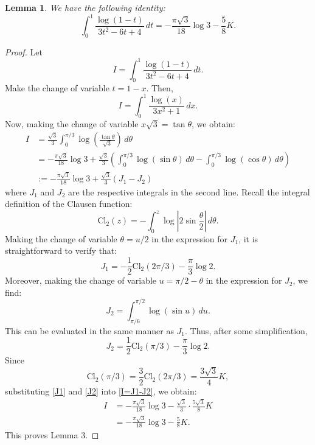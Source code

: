 \documentclass[10pt,a4paper]{amsart}
\numberwithin{equation}{section}
\newtheorem{lemma}{Lemma}
\begin{document}
\begin{lemma}
    We have the following identity:
    \begin{equation}
    \int_0^1\frac{\log(1-t)}{3t^2-6t+4}\,dt=-\frac{\pi\sqrt{3}}{18}\log3-\frac{5}{8}K.
    \label{lem3}
    \end{equation}
\end{lemma}

\begin{proof}
    Let 
    \[I=\int_0^1\frac{\log(1-t)}{3t^2-6t+4}\,dt.\]
    Make the change of variable $t=1-x$. Then,
    \[I=\int_0^1\frac{\log(x)}{3x^2+1}\,dx.\]
    Now, making the change of variable $x\sqrt3=\tan\theta$, we obtain:
    \begin{align}
        I&=\frac{\sqrt3}{3}\int_0^{\pi/3}\log\left(\frac{\tan\theta}{\sqrt3}\right)\,d\theta\nonumber\\
        &=-\frac{\pi\sqrt{3}}{18}\log3+\frac{\sqrt3}{3}\left(\int_0^{\pi/3}\log\left(\sin\theta\right)\,d\theta-\int_0^{\pi/3}\log\left(\cos\theta\right)\,d\theta\right)\nonumber\\
        &:=-\frac{\pi\sqrt{3}}{18}\log3+\frac{\sqrt3}3(J_1-J_2)
        \label{I=J1-J2}
    \end{align}
    where $J_1$ and $J_2$ are the respective integrals in the second line. Recall the integral definition of the Clausen function:
    \[\text{Cl}_2(z)=-\int_0^z\log\left|2\sin\frac{\theta}{2}\right|\,d\theta.\]
    Making the change of variable $\theta=u/2$ in the expression for $J_1$, it is straightforward to verify that:
    \begin{equation}
        J_1=-\frac12\text{Cl}_2(2\pi/3)-\frac\pi3\log2.
    \label{J1}
    \end{equation}
    Moreover, making the change of variable $u=\pi/2-\theta$ in the expression for $J_2$, we find:
    \[J_2=\int_{\pi/6}^{\pi/2}\log{(\sin u)}\,du.\]
    This can be evaluated in the same manner as $J_1$. Thus, after some simplification,
    \begin{equation}
    J_2=\frac12\text{Cl}_2(\pi/3)-\frac\pi3\log2.
    \label{J2}
    \end{equation}
    Since \[\text{Cl}_2(\pi/3)=\frac32\text{Cl}_2(2\pi/3)=\frac{3\sqrt3}{4}K,\]
    substituting \eqref{J1} and \eqref{J2} into \eqref{I=J1-J2}, we obtain:
    \begin{align*}
        I&=-\frac{\pi\sqrt{3}}{18}\log3-\frac{\sqrt3}3\cdot\frac{5\sqrt3}{8}K\\&=-\frac{\pi\sqrt{3}}{18}\log3-\frac{5}{8}K.
    \end{align*}
    This proves Lemma 3.
\end{proof}
\end{document}
